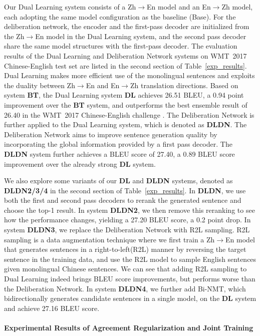 \documentclass[a4paper]{article}
\begin{document}
\begin{CJK*}{UTF8}{gbsn}
Our Dual Learning system consists of a Zh$\to$En model and an En$\to$Zh model, each adopting the same model configuration as the baseline (Base). For the deliberation network, the encoder and the first-pass decoder are initialized from the Zh$\to$En model in the Dual Learning system, and the second pass decoder share the same model structures with the first-pass decoder. 
The evaluation results of the Dual Learning and Deliberation Network systems on WMT~2017 Chinese-English test set are listed in the second section of Table~\ref{exp_results}. Dual Learning makes more efficient use of the monolingual sentences and exploits the duality between Zh$\to$En and En$\to$Zh translation directions. Based on system \textbf{BT}, the Dual Learning system \textbf{DL} achieves 26.51 BLEU, a 0.94 point improvement over the \textbf{BT} system, and outperforms the best ensemble result of 26.40 in the WMT~2017 Chinese-English challenge . The Deliberation Network is further applied to the Dual Learning system, which is denoted as \textbf{DLDN}. The Deliberation Network aims to improve sentence generation quality by incorporating the global information provided by a first pass decoder. The \textbf{DLDN} system further achieves a BLEU score of 27.40, a 0.89 BLEU score improvement over the already strong \textbf{DL} system.

We also explore some variants of our \textbf{DL} and \textbf{DLDN} systems, denoted as \textbf{DLDN2/3/4} in the second section of Table~\ref{exp_results}. 
In \textbf{DLDN}, we use both the first and second pass decoders to rerank the generated sentence and choose the top-1 result. In system \textbf{DLDN2}, we then remove this reranking to see how the performance changes, yielding a 27.20 BLEU score, a 0.2 point drop. In system \textbf{DLDN3}, we replace the Deliberation Network with R2L sampling. R2L sampling is a data augmentation technique where we first train a Zh$\to$En model that generates sentences in a right-to-left(R2L) manner by reversing the target sentence in the training data, and use the R2L model to sample English sentences given monolingual Chinese sentences. We can see that adding R2L sampling to Dual Learning indeed brings BLEU score improvements, but performs worse than the Deliberation Network. In system \textbf{DLDN4}, we further add Bi-NMT, which bidirectionally generates candidate sentences in a single model, on the \textbf{DL} system and achieve 27.16 BLEU score.

\paragraph{Experimental Results of Agreement Regularization and Joint Training}\mbox{}\\


\end{CJK*}
\end{document}
